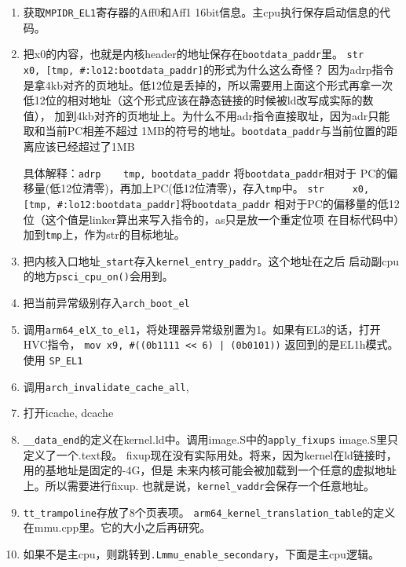 \begin{enumerate}
    \item 获取\verb!MPIDR_EL1!寄存器的Aff0和Aff1 16bit信息。主cpu执行保存启动信息的代码。
    \item 把x0的内容，也就是内核header的地址保存在\verb!bootdata_paddr!里。
          \verb!str     x0, [tmp, #:lo12:bootdata_paddr]!的形式为什么这么奇怪？
          因为adrp指令是拿4kb对齐的页地址。低12位是丢掉的，所以需要用上面这个形式再拿一次
          低12位的相对地址（这个形式应该在静态链接的时候被ld改写成实际的数值），
          加到4kb对齐的页地址上。为什么不用adr指令直接取址，因为adr只能取和当前PC相差不超过
          1MB的符号的地址。\verb!bootdata_paddr!与当前位置的距离应该已经超过了1MB

          具体解释：\verb!adrp    tmp, bootdata_paddr! 将\verb!bootdata_paddr!相对于
          PC的偏移量(低12位清零)，再加上PC(低12位清零)，存入\verb!tmp!中。
          \verb!str     x0, [tmp, #:lo12:bootdata_paddr]!将\verb!bootdata_paddr!
          相对于PC的偏移量的低12位（这个值是linker算出来写入指令的，as只是放一个重定位项
          在目标代码中）加到\verb!tmp!上，作为str的目标地址。

    \item 把内核入口地址\verb!_start!存入\verb!kernel_entry_paddr!。这个地址在之后
          启动副cpu的地方\verb|psci_cpu_on()|会用到。

    \item 把当前异常级别存入\verb!arch_boot_el!
    \item 调用\verb!arm64_elX_to_el1!，将处理器异常级别置为1。如果有EL3的话，打开HVC指令，
        \verb!mov x9, #((0b1111 << 6) | (0b0101))! 返回到的是EL1h模式。使用
        \verb!SP_EL1!
    \item 调用\verb!arch_invalidate_cache_all!, 
    \item 打开icache, dcache
    \item \verb!__data_end!的定义在kernel.ld中。调用image.S中的\verb!apply_fixups!
          image.S里只定义了一个.text段。
          fixup现在没有实际用处。将来，因为kernel在ld链接时，用的基地址是固定的-4G，但是
        未来内核可能会被加载到一个任意的虚拟地址上。所以需要进行fixup.
        也就是说，\verb!kernel_vaddr!会保存一个任意地址。

    \item \verb!tt_trampoline!存放了8个页表项。
    \verb!arm64_kernel_translation_table!的定义在mmu.cpp里。它的大小之后再研究。
    \item 如果不是主cpu，则跳转到\verb!.Lmmu_enable_secondary!，下面是主cpu逻辑。


\end{enumerate}

